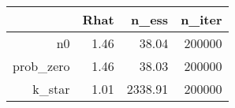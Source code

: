 \begin{table}[ht]
\centering
\begin{tabular}{rrrr}
  \hline
 & Rhat & n\_ess & n\_iter \\ 
  \hline
n0 & 1.46 & 38.04 & 200000 \\ 
  prob\_zero & 1.46 & 38.03 & 200000 \\ 
  k\_star & 1.01 & 2338.91 & 200000 \\ 
   \hline
\end{tabular}
\end{table}
